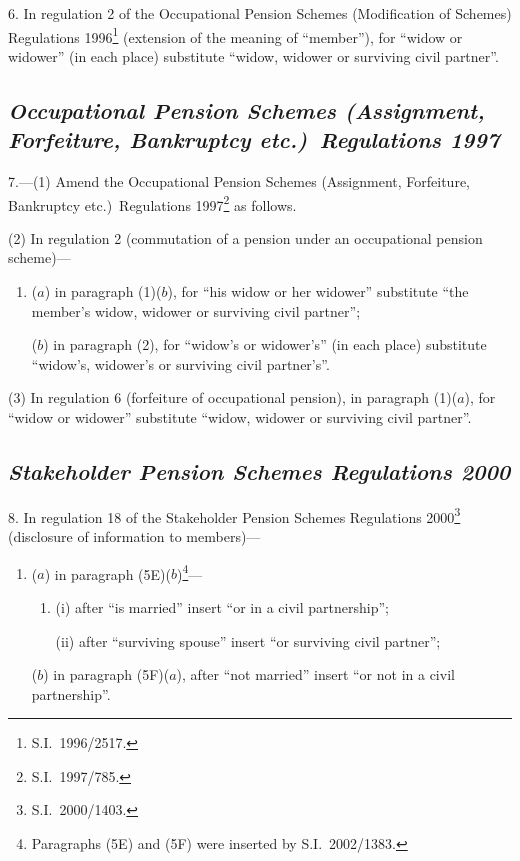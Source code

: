 \documentclass[12pt,a4paper]{article}
\begin{document}
6.  In regulation 2 of the Occupational Pension Schemes (Modification of Schemes) Regulations 1996\footnote{S.I.\ 1996/2517.} (extension of the meaning of “member”), for “widow or widower” (in each place) substitute “widow, widower or surviving civil partner”.

\subsection*{\itshape\sloppy Occupational Pension Schemes (Assignment, Forfeiture, Bankruptcy etc.)\ Regulations 1997}

7.---(1)  Amend the Occupational Pension Schemes (Assignment, Forfeiture, Bankruptcy etc.)\ Regulations 1997\footnote{S.I.\ 1997/785.} as follows.

(2) In regulation 2 (commutation of a pension under an occupational pension scheme)—
\begin{enumerate}\item[]
($a$) in paragraph (1)($b$), for “his widow or her widower” substitute “the member’s widow, widower or surviving civil partner”;

($b$) in paragraph (2), for “widow’s or widower's” (in each place) substitute “widow's, widower’s or surviving civil partner's”.
\end{enumerate}

(3) In regulation 6 (forfeiture of occupational pension), in paragraph (1)($a$), for “widow or widower” substitute “widow, widower or surviving civil partner”.

\subsection*{\itshape Stakeholder Pension Schemes Regulations 2000}

8.  In regulation 18 of the Stakeholder Pension Schemes Regulations 2000\footnote{S.I.\ 2000/1403.} (disclosure of information to members)—
\begin{enumerate}\item[]
($a$) in paragraph (5E)($b$)\footnote{Paragraphs (5E) and (5F) were inserted by S.I.\ 2002/1383.}—
\begin{enumerate}\item[]
(i) after “is married” insert “or in a civil partnership”;

(ii) after “surviving spouse” insert “or surviving civil partner”;
\end{enumerate}

($b$) in paragraph (5F)($a$), after “not married” insert “or not in a civil partnership”.
\end{enumerate}
\end{document}
